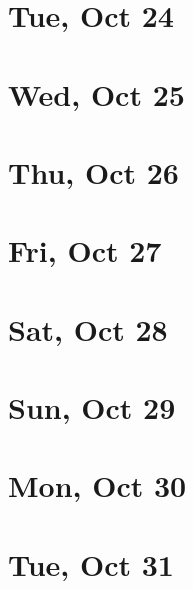 	\section{Tue, Oct 24}
		
	\section{Wed, Oct 25}
		
	\section{Thu, Oct 26}
		
	\section{Fri, Oct 27}
		
	\section{Sat, Oct 28}
		
	\section{Sun, Oct 29}
		
	\section{Mon, Oct 30}
		
	\section{Tue, Oct 31}
		
